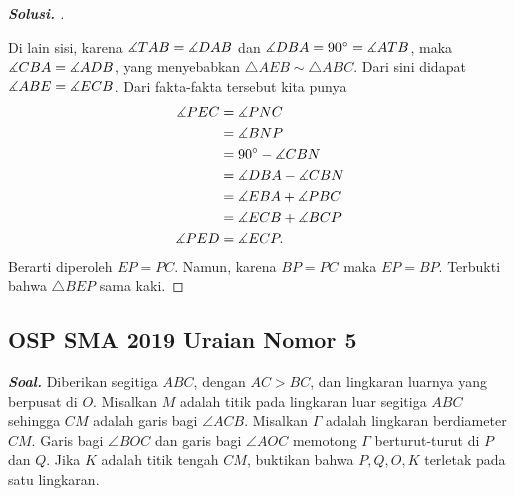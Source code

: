 \documentclass[letterpaper, 13pt]{scrartcl}
\begin{document}
\begin{proof}[\textbf{Solusi. }]
\begin{center}
\end{center}

    Di lain sisi, karena $\measuredangle TAB = \measuredangle DAB$ dan $\measuredangle DBA = 90^\circ = \measuredangle ATB$, maka $\measuredangle CBA = \measuredangle ADB$, yang menyebabkan $\triangle AEB \sim \triangle ABC$.
    Dari sini didapat $\measuredangle ABE = \measuredangle ECB$. 
    Dari fakta-fakta tersebut kita punya
    \begin{align*}
        \measuredangle PEC
        &= \measuredangle PNC \\
        &= \measuredangle BNP \\
        &= 90^\circ - \measuredangle CBN \\
        &= \measuredangle DBA - \measuredangle CBN \\
        &= \measuredangle EBA + \measuredangle PBC \\
        &= \measuredangle ECB + \measuredangle BCP \\
        \measuredangle PED &= \measuredangle ECP.
    \end{align*}
    Berarti diperoleh $EP=PC$. Namun, karena $BP=PC$ maka $EP=BP$. Terbukti bahwa $\triangle BEP$ sama kaki.
\end{proof}

\subsection{OSP SMA 2019 Uraian Nomor 5}

\textbf{\textit{Soal. }}Diberikan segitiga $ABC$, dengan $AC > BC$, dan lingkaran luarnya yang berpusat di $O$. Misalkan $M$ adalah titik pada lingkaran luar segitiga $ABC$ sehingga $CM$ adalah garis bagi $\angle ACB$. Misalkan $\Gamma$ adalah lingkaran berdiameter $CM$. Garis bagi $\angle BOC$ dan garis bagi $\angle AOC$ memotong $\Gamma$ berturut-turut di $P$ dan $Q$. Jika $K$ adalah titik tengah $CM$, buktikan bahwa $P, Q, O, K$ terletak pada satu lingkaran.
\end{document}
